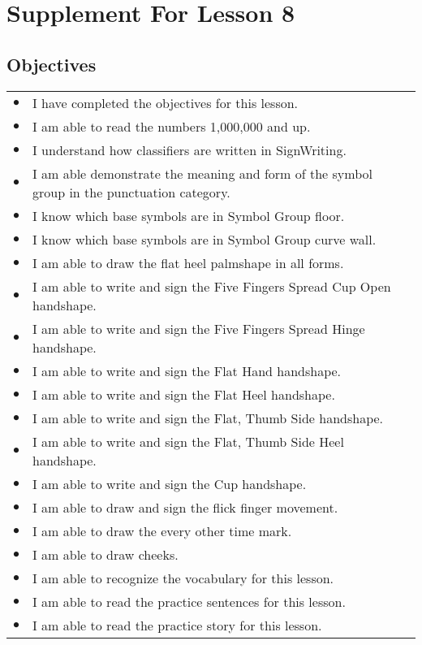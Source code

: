 \documentclass{article}
\begin{document}
\newfontfamily{}
\newfontfamily{}
\newcommand{\bul}{\hfil$\bullet$&}
\renewenvironment{glossary}{\begin{multicols}{5}\begin{center}}{\end{center}\end{multicols}}
\setcounter{secnumdepth}{0}
\setlength{\columnseprule}{1pt}

\section{Supplement For Lesson 8}

\subsection{Objectives}

\begin{tabular}{p{1cm}p{14cm}}
\bul I have completed the objectives for this lesson.\\
\bul I am able to read the numbers 1,000,000 and up.\\
\bul I understand how classifiers are written in SignWriting.\\
\bul I am able demonstrate the meaning and form of the symbol group in the punctuation category.\\
\bul I know which base symbols are in Symbol Group floor.\\
\bul I know which base symbols are in Symbol Group curve wall.\\
\bul I am able to draw the flat heel palmshape in all forms.\\
\bul I am able to write and sign the Five Fingers Spread Cup Open handshape.\\
\bul I am able to write and sign the Five Fingers Spread Hinge handshape.\\
\bul I am able to write and sign the Flat Hand handshape.\\
\bul I am able to write and sign the Flat Heel handshape.\\
\bul I am able to write and sign the Flat, Thumb Side handshape.\\
\bul I am able to write and sign the Flat, Thumb Side Heel handshape.\\
\bul I am able to write and sign the Cup handshape.\\
\bul I am able to draw and sign the flick finger movement.\\
\bul I am able to draw the every other time mark.\\
\bul I am able to draw cheeks.\\
\bul I am able to recognize the vocabulary for this lesson.\\
\bul I am able to read the practice sentences for this lesson.\\
\bul I am able to read the practice story for this lesson.\\
\end{tabular}
\end{document}
